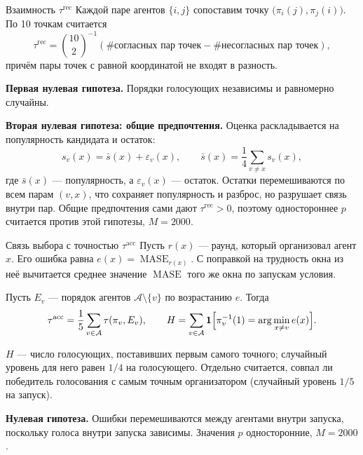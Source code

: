 \documentclass[aspectratio=169,11pt]{beamer}
\DeclareMathOperator{\MASE}{MASE}
\newcommand{\ind}{\mathbf 1}
\begin{document}
\begin{frame}{Взаимность $\tau^{\mathrm{rec}}$}
\small Каждой паре агентов $\{i,j\}$ сопоставим точку $\bigl(\pi_i(j),\pi_j(i)\bigr)$. По 10 точкам считается
\[\tau^{\mathrm{rec}}=\binom{10}{2}^{-1}(\#\text{согласных пар точек}-\#\text{несогласных пар точек}),\]
причём пары точек с равной координатой не входят в разность.

\medskip
\textbf{Первая нулевая гипотеза.} Порядки голосующих независимы и равномерно случайны.

\medskip
\textbf{Вторая нулевая гипотеза: общие предпочтения.} Оценка раскладывается на популярность кандидата и остаток:
\[s_v(x)=\bar s(x)+\varepsilon_v(x),\qquad \bar s(x)=\frac14\sum_{v\ne x}s_v(x),\]
где $\bar s(x)$ --- популярность, а $\varepsilon_v(x)$ --- остаток.
Остатки перемешиваются по всем парам $(v,x)$, что сохраняет популярность и разброс, но разрушает связь внутри пар. Общие предпочтения сами дают $\tau^{\mathrm{rec}}>0$, поэтому одностороннее $p$ считается против этой гипотезы, $M=2000$.
\end{frame}

\begin{frame}{Связь выбора с точностью $\tau^{\mathrm{acc}}$}
\small Пусть $r(x)$ --- раунд, который организовал агент $x$. Его ошибка равна $e(x)=\MASE_{r(x)}$. С поправкой на трудность окна из неё вычитается среднее значение $\MASE$ того же окна по запускам условия.

\medskip
Пусть $E_v$ --- порядок агентов $\mathcal A\setminus\{v\}$ по возрастанию $e$. Тогда
\[\tau^{\mathrm{acc}}=\frac15\sum_{v\in\mathcal A}\tau(\pi_v,E_v),\qquad H=\sum_{v\in\mathcal A}\ind\Bigl[\pi_v^{-1}(1)=\arg\min_{x\ne v}e(x)\Bigr].\]

$H$ --- число голосующих, поставивших первым самого точного; случайный уровень для него равен $1/4$ на голосующего. Отдельно считается, совпал ли победитель голосования с самым точным организатором (случайный уровень $1/5$ на запуск).

\medskip
\textbf{Нулевая гипотеза.} Ошибки перемешиваются между агентами внутри запуска, поскольку голоса внутри запуска зависимы. Значения $p$ односторонние, $M=2000$.
\end{frame}
\end{document}
